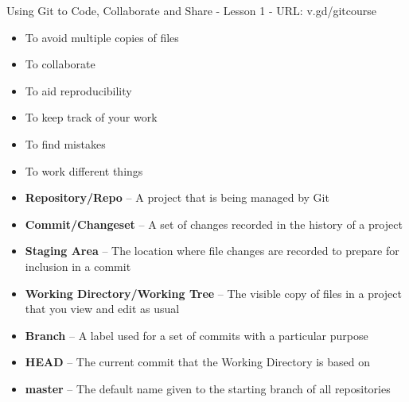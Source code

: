 \documentclass[9pt]{extarticle}
\def\itempad{-1pt}
\begin{document}
\thispagestyle{empty}

\begin{center}
  {\LARGE
  Using Git to Code, Collaborate and Share - Lesson 1 - URL: v.gd/gitcourse}
\end{center}

\begin{navybox}[title=Why use version control?]
  \begin{multicols}{2}
    \begin{itemize}
      \itemsep\itempad
    \item To avoid multiple copies of files
    \item To collaborate
    \item To aid reproducibility
    \item To keep track of your work
    \item To find mistakes
    \item To work different things
    \end{itemize}
  \end{multicols}
\end{navybox}

\begin{bluebox}[title=Git Glossary]
  \begin{itemize}
    \itemsep\itempad
  \item \textbf{Repository/Repo} -- A project that is being managed by Git
  \item \textbf{Commit/Changeset} -- A set of changes recorded in the history of
    a project
  \item \textbf{Staging Area} -- The location where file changes are recorded to
    prepare for inclusion in a commit
  \item \textbf{Working Directory/Working Tree} -- The visible copy of files in a
    project that you view and edit as usual
  \item \textbf{Branch} -- A label used for a set of commits with a particular
    purpose
  \item \textbf{HEAD} -- The current commit that the Working Directory is based on
  \item \textbf{master} -- The default name given to the starting branch of all repositories
  \end{itemize}
\end{bluebox}
\end{document}
